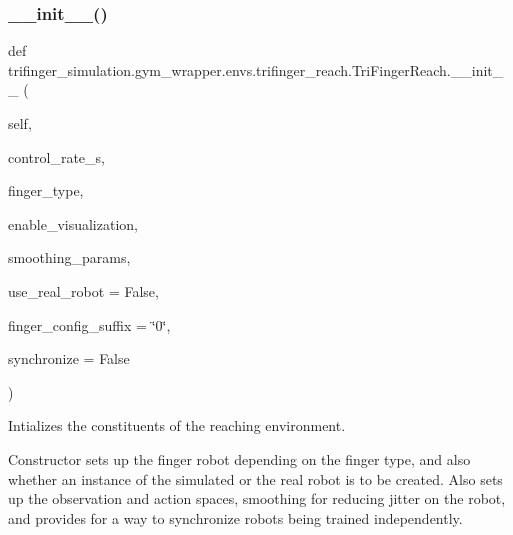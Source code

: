 \subsubsection{\texorpdfstring{\+\_\+\+\_\+init\+\_\+\+\_\+()}{\_\_init\_\_()}}
{\footnotesize\ttfamily def trifinger\+\_\+simulation.\+gym\+\_\+wrapper.\+envs.\+trifinger\+\_\+reach.\+Tri\+Finger\+Reach.\+\_\+\+\_\+init\+\_\+\+\_\+ (\begin{DoxyParamCaption}\item[{}]{self,  }\item[{}]{control\+\_\+rate\+\_\+s,  }\item[{}]{finger\+\_\+type,  }\item[{}]{enable\+\_\+visualization,  }\item[{}]{smoothing\+\_\+params,  }\item[{}]{use\+\_\+real\+\_\+robot = {\ttfamily False},  }\item[{}]{finger\+\_\+config\+\_\+suffix = {\ttfamily \char`\"{}0\char`\"{}},  }\item[{}]{synchronize = {\ttfamily False} }\end{DoxyParamCaption})}



Intializes the constituents of the reaching environment. 

Constructor sets up the finger robot depending on the finger type, and also whether an instance of the simulated or the real robot is to be created. Also sets up the observation and action spaces, smoothing for reducing jitter on the robot, and provides for a way to synchronize robots being trained independently.


